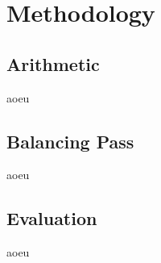 \section{Methodology}
\label{methodology}
\subsection{Arithmetic}
aoeu
\subsection{Balancing Pass}
aoeu
\subsection{Evaluation}
aoeu
